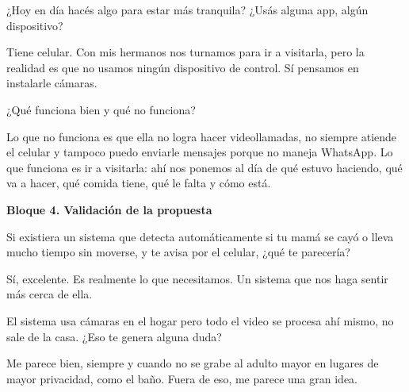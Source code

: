\begin{description}[leftmargin=0cm, labelsep=0.5cm]

    \item[\textbf{Entrevistador:}] ¿Hoy en día hacés algo para estar más tranquila?
    ¿Usás alguna app, algún dispositivo?

    \item[\textbf{Entrevistada:}] Tiene celular.
    Con mis hermanos nos turnamos para ir a visitarla, pero la realidad es que no usamos ningún dispositivo de control.
    Sí pensamos en instalarle cámaras.

    \item[\textbf{Entrevistador:}] ¿Qué funciona bien y qué no funciona?

    \item[\textbf{Entrevistada:}] Lo que no funciona es que ella no logra hacer videollamadas, no siempre atiende el celular y tampoco puedo enviarle mensajes porque no maneja WhatsApp.
    Lo que funciona es ir a visitarla: ahí nos ponemos al día de qué estuvo haciendo, qué va a hacer, qué comida tiene, qué le falta y cómo está.

\end{description}

\bigskip
\textbf{Bloque 4. Validación de la propuesta}

\begin{description}[leftmargin=0cm, labelsep=0.5cm]

    \item[\textbf{Entrevistador:}] Si existiera un sistema que detecta automáticamente si tu mamá se cayó o lleva mucho tiempo sin moverse, y te avisa por el celular, ¿qué te parecería?

    \item[\textbf{Entrevistada:}] Sí, excelente.
    Es realmente lo que necesitamos.
    Un sistema que nos haga sentir más cerca de ella.

    \item[\textbf{Entrevistador:}] El sistema usa cámaras en el hogar pero todo el video se procesa ahí mismo, no sale de la casa.
    ¿Eso te genera alguna duda?

    \item[\textbf{Entrevistada:}] Me parece bien, siempre y cuando no se grabe al adulto mayor en lugares de mayor privacidad, como el baño.
    Fuera de eso, me parece una gran idea.

\end{description}


